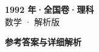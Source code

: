 \documentclass[zihao=-4, a4paper]{ctexart}
\begin{document}
\begin{center}
  {\Large\bfseries 1992 年·全国卷·理科}\\[4pt]
  {\large 数学 · 解析版}
\end{center}
\medskip
{}

\clearpage
{}
\begin{center}{\Large\bfseries 参考答案与详细解析}\end{center}
\medskip

\end{document}
